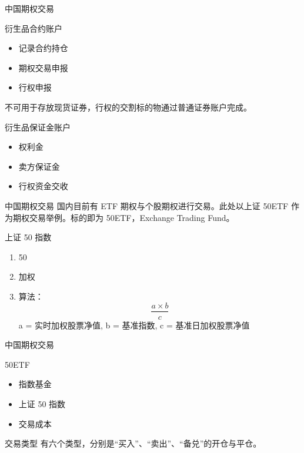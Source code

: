 \documentclass[12pt]{ctexbeamer}	%
\begin{document}
\begin{frame}{中国期权交易}
  \begin{block}{衍生品合约账户}
    \begin{itemize}
      \item 记录合约持仓
      \item 期权交易申报
      \item 行权申报
    \end{itemize}
    不可用于存放现货证券，行权的交割标的物通过普通证券账户完成。
  \end{block}
  \begin{block}{衍生品保证金账户}
    \begin{itemize}
      \item 权利金
      \item 卖方保证金
      \item 行权资金交收
    \end{itemize}
  \end{block}
\end{frame}

\begin{frame}{中国期权交易}
  国内目前有 ETF 期权与个股期权进行交易。此处以上证 50ETF 作为期权交易举例。标的即为 50ETF，Exchange Trading Fund。
  \begin{block}{上证 50 指数}
    \begin{enumerate}
      \item 50
      \item 加权
      \item 算法：$$\frac{a \times b}{c}$$a = 实时加权股票净值, b = 基准指数, c = 基准日加权股票净值
    \end{enumerate}
  \end{block}
\end{frame}

\begin{frame}{中国期权交易}
  \begin{block}{50ETF}
    \begin{itemize}
      \item 指数基金
      \item 上证 50 指数
      \item 交易成本
    \end{itemize}
  \end{block}
  \begin{block}{交易类型}
    有六个类型，分别是“买入”、“卖出”、“备兑”的开仓与平仓。
  \end{block}
\end{frame}
\end{document}
